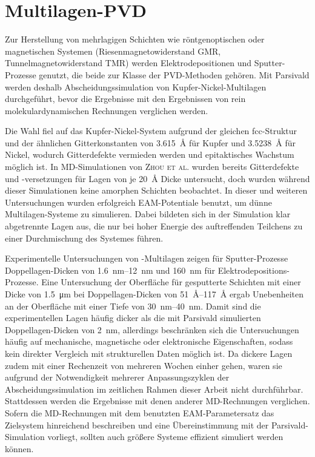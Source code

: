 \section{Multilagen-PVD}
\label{multilayer}

Zur Herstellung von mehrlagigen Schichten wie röntgenoptischen oder magnetischen Systemen (Riesenmagnetowiderstand GMR, Tunnelmagnetowiderstand TMR) werden Elektrodepositionen\cite{yang_pulsed_1995} und Sputter-Prozesse\cite{barshilia_characterization_2002,cammarata_nanoindentation_1990} genutzt, die beide zur Klasse der PVD-Methoden gehören.
Mit Parsivald werden deshalb Abscheidungssimulation von Kupfer-Nickel-Multilagen durchgeführt, bevor die Ergebnisse mit den Ergebnissen von rein molekulardynamischen Rechnungen verglichen werden.

Die Wahl fiel auf das Kupfer-Nickel-System aufgrund der gleichen fcc-Struktur und der ähnlichen Gitterkonstanten von \SI{3.615}{\angstrom} für Kupfer und \SI{3.5238}{\angstrom} für Nickel\cite{haynes_crc_2011}, wodurch Gitterdefekte vermieden werden und epitaktisches Wachstum möglich ist\cite{zhou_atomistic_1998}.
In MD-Simulationen von \textsc{Zhou et al.}\cite{zhou_atomistic_1998} wurden bereits Gitterdefekte und -versetzungen für Lagen von je \SI{20}{\angstrom} Dicke untersucht, doch wurden während dieser Simulationen keine amorphen Schichten beobachtet.
In dieser und weiteren Untersuchungen\cite{zhou_atomic_2001} wurden erfolgreich EAM-Potentiale benutzt, um dünne Multilagen-Systeme zu simulieren.
Dabei bildeten sich in der Simulation klar abgetrennte Lagen aus, die nur bei hoher Energie des auftreffenden Teilchens zu einer Durchmischung des Systemes führen\cite{zhou_atomistic_1998}.

Experimentelle Untersuchungen von -Multilagen zeigen für Sputter-Prozesse Doppel\-lagen-Dicken von \SIrange{1.6}{12}{\nano\meter}\cite{cammarata_nanoindentation_1990} und \SI{160}{\nano\meter} für Elektrodepositions-Prozesse\cite{yang_pulsed_1995}.
Eine Untersuchung der Oberfläche für gesputterte Schichten mit einer Dicke von \SI{1.5}{\micro\meter} bei Doppellagen-Dicken von \SIrange{51}{117}{\angstrom} ergab Unebenheiten an der Oberfläche mit einer Tiefe von \SIrange{30}{40}{\nano\meter}\cite{barshilia_characterization_2002}.
Damit sind die experimentellen Lagen häufig dicker als die mit Parsivald simulierten Doppellagen-Dicken von \SI{2}{\nano\meter}, allerdings beschränken sich die Untersuchungen häufig auf mechanische, magnetische oder elektronische Eigenschaften, sodass kein direkter Vergleich mit strukturellen Daten möglich ist.
Da dickere Lagen zudem mit einer Rechenzeit von mehreren Wochen einher gehen, waren sie aufgrund der Notwendigkeit mehrerer Anpassungszyklen der Abscheidungssimulation im zeitlichen Rahmen dieser Arbeit nicht durchführbar.
Stattdessen werden die Ergebnisse mit denen anderer MD-Rechnungen verglichen.
Sofern die MD-Rechnungen mit dem benutzten EAM-Parametersatz das Zielsystem hinreichend beschreiben und eine Übereinstimmung mit der Parsivald-Simulation vorliegt, sollten auch größere Systeme effizient simuliert werden können.

